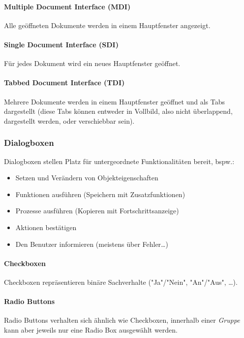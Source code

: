 				\paragraph{Multiple Document Interface (MDI)}
					Alle geöffneten Dokumente werden in einem Hauptfenster angezeigt.

				\paragraph{Single Document Interface (SDI)}
					Für jedes Dokument wird ein neues Hauptfenster geöffnet.

				\paragraph{Tabbed Document Interface (TDI)}
					Mehrere Dokumente werden in einem Hauptfenster geöffnet und als Tabs dargestellt (diese Tabs können entweder in Vollbild, also nicht überlappend, dargestellt werden, oder verschiebbar sein).

			\subsubsection{Dialogboxen}
				Dialogboxen stellen Platz für untergeordnete Funktionalitäten bereit, bspw.:
				\begin{itemize}
					\item Setzen und Verändern von Objekteigenschaften
					\item Funktionen ausführen (\zB Speichern mit Zusatzfunktionen)
					\item Prozesse ausführen (\zB Kopieren mit Fortschrittsanzeige)
					\item Aktionen bestätigen
					\item Den Benutzer informieren (meistens über Fehler\dots)
				\end{itemize}

				\paragraph{Checkboxen}
					Checkboxen repräsentieren binäre Sachverhalte ("Ja"/"Nein", "An"/"Aus", \dots).

				\paragraph{Radio Buttons}
					Radio Buttons verhalten sich ähnlich wie Checkboxen, innerhalb einer \emph{Gruppe} kann aber jeweils nur eine Radio Box ausgewählt werden.

